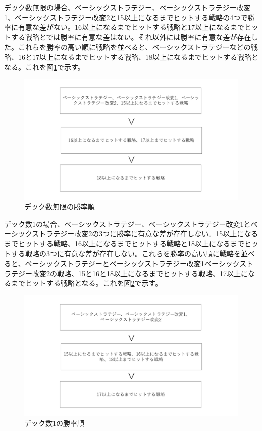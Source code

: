 デック数無限の場合、ベーシックストラテジー、ベーシックストラテジー改変1、ベーシックストラテジー改変2と15以上になるまでヒットする戦略の4つで勝率に有意な差がない。16以上になるまでヒットする戦略と17以上になるまでヒットする戦略とでは勝率に有意な差はない。それ以外には勝率に有意な差が存在した。これらを勝率の高い順に戦略を並べると、ベーシックストラテジーなどの戦略、16と17以上になるまでヒットする戦略、18以上になるまでヒットする戦略となる。これを図\ref{rate1}で示す。

\begin{figure}[H]
 \begin{center} 
  \includegraphics[width=0.7\linewidth]{./figure/statistics-rate1}
  \caption{デック数無限の勝率順\label{rate1}}
 \end{center}
\end{figure}

デック数1の場合、ベーシックストラテジー、ベーシックストラテジー改変1とベーシックストラテジー改変2の3つに勝率に有意な差が存在しない。15以上になるまでヒットする戦略、16以上になるまでヒットする戦略と18以上になるまでヒットする戦略の3つに有意な差が存在しない。これらを勝率の高い順に戦略を並べると、ベーシックストラテジーとベーシックストラテジー改変1ベーシックストラテジー改変2の戦略、15と16と18以上になるまでヒットする戦略、17以上になるまでヒットする戦略となる。これを図\ref{rate2}で示す。

\begin{figure}[H]
 \begin{center} 
  \includegraphics[width=0.7\linewidth]{./figure/statistics-rate2}
  \caption{デック数1の勝率順\label{rate2}}
 \end{center}
\end{figure}

